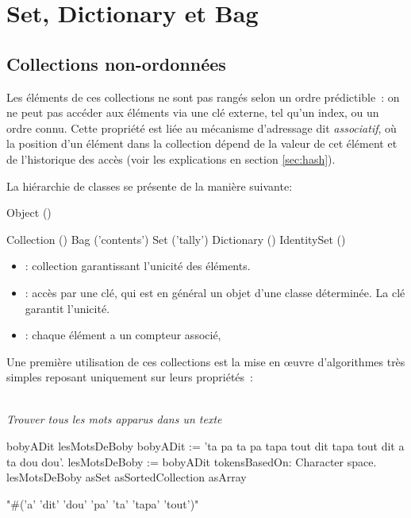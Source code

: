 \ifx\wholebook\relax\else


\fi

\chapter{Set, Dictionary et Bag}

\section{Collections non-ordonn\'ees}





Les \'el\'ements de ces collections ne sont pas rang\'es selon un
ordre pr\'edictible~:  on ne peut pas acc\'eder aux \'el\'ements
via une cl\'e externe, tel qu'un index, ou un ordre connu. 
Cette propri\'et\'e est li\'ee au m\'ecanisme
d'adressage dit {\sl associatif}, o\`u la position d'un \'el\'ement
dans la collection d\'epend de la valeur de cet \'el\'ement
et de l'historique des acc\`es
(voir les explications en section \ref{sec:hash}).

La hi\'erarchie de classes se pr\'esente de la mani\`ere suivante:

\begin{scode}
Object ()

    Collection ()
        Bag ('contents')
        Set ('tally')
            Dictionary ()
            IdentitySet ()

\end{scode}

\begin{itemize}
\item {} : collection garantissant l'unicit\'e des \'el\'ements.
\item {} : acc\`es par une cl\'e, 
qui est en g\'en\'eral un objet d'une classe d\'etermin\'ee.
La cl\'e garantit l'unicit\'e.
\item {} : chaque  \'el\'ement a un compteur associ\'e,
\end{itemize}

Une premi\`ere utilisation de ces collections est la 
mise en {\oe}uvre d'algorithmes tr\`es simples reposant uniquement sur leurs
propri\'et\'es~:
 
 ~\\{\em Trouver tous les mots apparus dans un texte} 
 \begin{scode} 
 
\stBar bobyADit lesMotsDeBoby \stBar
bobyADit := 'ta pa ta pa tapa tout dit tapa tout dit a ta dou dou'.
lesMotsDeBoby := bobyADit tokensBasedOn: Character space.
lesMotsDeBoby asSet asSortedCollection asArray

 "#('a' 'dit' 'dou' 'pa' 'ta' 'tapa' 'tout')"
\end{scode}

